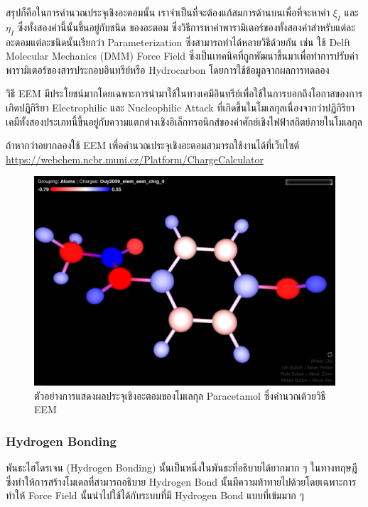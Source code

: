 สรุปก็คือในการคำนวณประจุเชิงอะตอมนั้น เราจำเป็นที่จะต้องแก้สมการด้านบนเพื่อที่จะหาค่า $\xi_I$ และ $\eta_I$ ซึ่งทั้งสองค่านี้นั้นขึ้นอยู่กับชนิด%
ของอะตอม ซึ่งวิธีการหาค่าพารามิเตอร์ของทั้งสองค่าสำหรับแต่ละอะตอมแต่ละชนิดนั้นเรียกว่า Parameterization ซึ่งสามารถทำได้หลายวิธีด้วยกัน เช่น 
ใช้ Delft Molecular Mechanics (DMM) Force Field ซึ่งเป็นเทคนิคที่ถูกพัฒนาขึ้นมาเพื่อทำการปรับค่าพารามิเตอร์ของสารประกอบอินทรีย์หรือ
Hydrocarbon โดยการใช้ข้อมูลจากผลการทดลอง 

วิธี EEM มีประโยชน์มากโดยเฉพาะการนำมาใช้ในทางเคมีอินทรีย์เพื่อใช้ในการบอกถึงโอกาสของการเกิดปฏิกิริยา Electrophilic และ Nucleophilic 
Attack ที่เกิดขึ้นในโมเลกุลเนื่องจากว่าปฏิกิริยาเคมีทั้งสองประเภทนี้ขึ้นอยู่กับความแตกต่างเชิงอิเล็กทรอนิกส์ของค่าศักย์เชิงไฟฟ้าสถิตย์ภายในโมเลกุล 

ถ้าหากว่าอยากลองใช้ EEM เพื่อคำนวณประจุเชิงอะตอมสามารถใช้งานได้ที่เว็บไซต์ \url{https://webchem.ncbr.muni.cz/Platform/ChargeCalculator}

\begin{figure}[htbp]
    \centering
    \includegraphics[width=0.8\linewidth]{fig/EEM-paracetamol.png}
    \caption{ตัวอย่างการแสดงผลประจุเชิงอะตอมของโมเลกุล Paracetamol ซึ่งคำนวณด้วยวิธี EEM}
    \label{fig:EEM_paracetamol}
\end{figure}

\subsubsection{Hydrogen Bonding}

พันธะไฮโดรเจน (Hydrogen Bonding) นั้นเป็นหนึ่งในพันธะที่อธิบายได้ยากมาก ๆ ในทางทฤษฎี ซึ่งทำให้การสร้างโมเดลที่สามารถอธิบาย Hydrogen 
Bond นั้นมีความท้าทายไปด้วยโดยเฉพาะการทำให้ Force Field นั้นนำไปใช้ได้กับระบบที่มี Hydrogen Bond แบบที่เข้มมาก ๆ 

